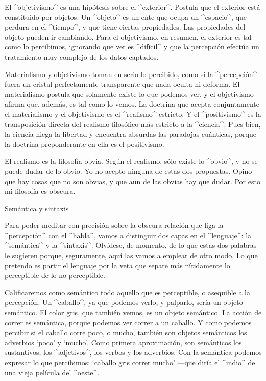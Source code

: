 El ^objetivismo^ es una hipótesis sobre el ^exterior^. Postula que el
exterior está constituido por objetos. Un ^objeto^ es un ente que ocupa
un ^espacio^, que perdura en el ^tiempo^, y que tiene ciertas
propiedades. Las propiedades del objeto pueden ir cambiando. Para el
objetivismo, en resumen, el exterior es tal como lo percibimos,
ignorando que ver es ^difícil^ y que la percepción efectúa un
tratamiento muy complejo de los datos captados.

Materialismo y objetivismo toman en serio lo percibido, como si la
^percepción^ fuera un cristal perfectamente transparente que nada oculta
ni deforma. El materialismo postula que solamente existe lo que podemos
ver, y el objetivismo afirma que, además, es tal como lo vemos. La
doctrina que acepta conjuntamente el materialismo y el objetivismo es el
^realismo^ estricto. Y el ^positivismo^ es la transposición directa del
realismo filosófico más estricto a la ^ciencia^. Pues bien, la ciencia
niega la libertad y encuentra absurdas las paradojas cuánticas, porque
la doctrina preponderante en ella es el positivismo.

El realismo es la filosofía obvia. Según el realismo, sólo existe lo
^obvio^, y no se puede dudar de lo obvio. Yo no acepto ninguna de estas
dos propuestas. Opino que hay cosas que no son obvias, y que aun de las
obvias hay que dudar. Por esto mi filosofía es obscura.


\Section Semántica y sintaxis

Para poder meditar con precisión sobre la obscura relación que liga la
^percepción^ con el ^habla^, vamos a distinguir dos capas en el
^lenguaje^: la ^semántica^ y la ^sintaxis^. Olvídese, de momento, de lo
que estas dos palabras le sugieren porque, seguramente, aquí las vamos a
emplear de otro modo. Lo que pretendo es partir el lenguaje por la veta
que separe más nítidamente lo perceptible de lo no perceptible.

Calificaremos como semántico todo aquello que es perceptible, o
asequible a la percepción. Un ^caballo^, ya que podemos verlo, y
palparlo, sería un objeto semántico. El color gris, que también vemos,
es un objeto semántico. La acción de correr es semántica, porque podemos
ver correr a un caballo. Y como podemos percibir si el caballo corre
poco, o mucho, también son objetos semánticos los adverbios `poco' y
`mucho'. Como primera aproximación, son semánticos los sustantivos, los
^adjetivos^, los verbos y los adverbios. Con la semántica podemos
expresar lo que percibimos: `caballo gris correr mucho' ---que diría el
^indio^ de una vieja película del ^oeste^.

